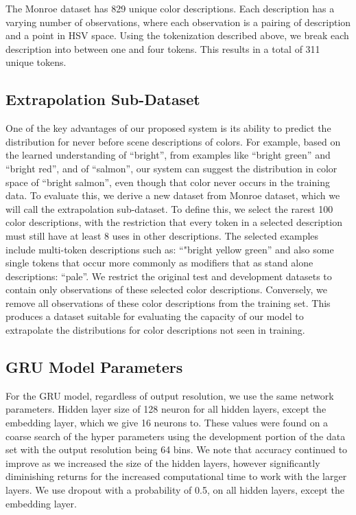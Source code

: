 \documentclass[11pt,letterpaper]{article}
\newcommand{\parencite}{\cite}
\begin{document}
The Monroe dataset has 829 unique color descriptions.
Each description has a varying number of observations, where each observation is a pairing of description and a point in HSV space.
Using the tokenization described above, we break each description into between one and four tokens.
This results in a total of 311 unique tokens.

\subsection{Extrapolation Sub-Dataset}
One of the key advantages of our proposed system is its ability to predict the distribution for never before scene descriptions of colors.
For example, based on the learned understanding of ``bright'', from examples like ``bright green'' and ``bright red'', and of ``salmon'', our system can suggest the distribution in color space of ``bright salmon'', even though that color never occurs in the training data.
To evaluate this, we derive a new dataset from Monroe dataset, which we will call the extrapolation sub-dataset.
To define this, we select the rarest 100 color descriptions,
with the restriction that every token in a selected description must still have at least 8 uses in other descriptions.
The selected examples include multi-token descriptions such as: ``"bright yellow green'' and also some single tokens that occur more commonly as modifiers that as stand alone descriptions: ``pale''.
We restrict the original test and development datasets to contain only observations of these selected color descriptions.
Conversely, we remove all observations of these color descriptions from the training set.
This produces a dataset suitable for evaluating the capacity of our model to extrapolate the distributions for color descriptions not seen in training.

\subsection{GRU Model Parameters}
For the GRU model, regardless of output resolution, we use the same network parameters.
Hidden layer size of 128 neuron for all hidden layers, except the embedding layer, which we give 16 neurons to.
These values were found on a coarse search of the hyper parameters using the development portion of the data set with the output resolution being 64 bins.
We note that accuracy continued to improve as  we increased the size of the hidden layers,
however significantly diminishing returns for the increased computational time to work with the larger layers.
We use dropout \parencite{srivastava2014dropout} with a probability of 0.5, on all hidden layers, except the embedding layer.
\end{document}
